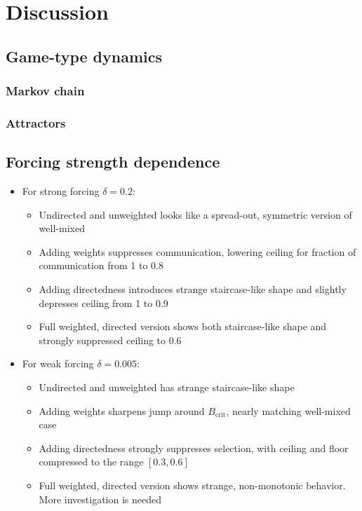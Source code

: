 \documentclass[openacc]{class/rsprocb_new}
\begin{document}
\section{Discussion}
\subsection{Game-type dynamics}
\subsubsection{Markov chain}
\subsubsection{Attractors}

\subsection{Forcing strength dependence}
\begin{itemize}
  \item For strong forcing $\delta = 0.2$:
  \begin{itemize}
    \item Undirected and unweighted looks like a spread-out, symmetric
      version of well-mixed
    \item Adding weights suppresses communication, lowering ceiling
      for fraction of communication from \num{1} to \num{0.8}
    \item Adding directedness introduces strange staircase-like shape
      and slightly depresses ceiling from \num{1} to \num{0.9}
    \item Full weighted, directed version shows both staircase-like
      shape and strongly suppressed ceiling to \num{0.6}
  \end{itemize}
  \item For weak forcing $\delta = 0.005$:
  \begin{itemize}
    \item Undirected and unweighted has strange staircase-like shape
    \item Adding weights sharpens jump around $B_\text{crit}$, nearly
      matching well-mixed case
    \item Adding directedness strongly suppresses selection, with
      ceiling and floor compressed to the range $[0.3,0.6]$
    \item Full weighted, directed version shows strange, non-monotonic
      behavior. More investigation is needed
  \end{itemize}
\end{itemize}
\end{document}
